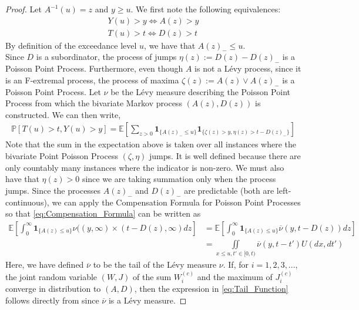 \documentclass[12pt, a4paper]{article}
\newcommand{\ex}{\mathbb {E}}
\newcommand{\pr}{\mathbb {P}}
\newcommand{\1}{\mathbf 1}
\begin{document}
\begin{proof}
Let $A^{-1}(u)=z$ and $y \geq u$.  We first note the following equivalences:
\begin{align*}
Y(u) > y \iff A(z) > y \\
T(u) > t \iff D(z) > t
\end{align*}
By definition of the exceedance level $u$, we have that $A(z)_{-} \leq u$.
\\

Since $D$ is a subordinator, the process of jumps $\eta(z):=D(z)-D(z)_{-}$ is a Poisson Point Process. Furthermore, even though $A$ is not a L\'evy process, since it is an F-extremal process, the process of maxima $\zeta(z):=A(z) \vee A(z)_{-}$ is a Poisson Point Process. Let $\nu$ be the L\'evy measure describing the Poisson Point Process from which the bivariate Markov process $(A(z),D(z))$ is constructed. We can then write,
\begin{align}\label{eq:Compensation_Formula}
\pr [T(u) > t, Y(u) > y] = \ex \left[\sum_{z>0} \mathbf 1_{\{A(z)_{-} \leq u\}} \mathbf 1_{\{\zeta(z) > y , \eta(z) > t - D(z)_{-}\}} \right]
\end{align}
Note that the sum in the expectation above is taken over all instances where the bivariate Point Poisson Process $(\zeta, \eta)$ jumps. It is well defined because there are only countably many instances where the indicator is non-zero. We must also have that $\eta(z)>0$ since we are taking summation only when the process jumps. Since the processes $A(z)_{-}$ and $D(z)_{-}$ are predictable (both are left-continuous), we can apply the Compensation Formula for Poisson Point Processes so that \eqref{eq:Compensation_Formula} can be written as
\begin{align*}
\ex \left[\int_{0}^{\infty} \mathbf 1_{\{A(z) \leq u\}} \nu((y,\infty)\times (t-D(z),\infty) dz \right] &= \ex \left[\int_{0}^{\infty} \mathbf 1_{\{A(z) \leq u\}} \overline{\nu}(y,t-D(z)) dz \right] \\
&= \iint\limits_{x \le u, t' \in [0,t)} \overline \nu(y, t - t') U(dx, dt')
\end{align*}
Here, we have defined $\overline{\nu}$ to be the tail of the L\'evy measure $\nu$. If, for $i=1,2,3,...$, the joint random variable $(W,J)$ of the sum $W_i^{(c)}$ and the maximum of $J_i^{(c)}$ converge in distribution to $(A,D)$, then the expression in \eqref{eq:Tail_Function} follows directly from \cite[Theorem 3.5]{Hees16} since $\overline{\nu}$ is a L\'evy measure.

\end{proof}
\end{document}
